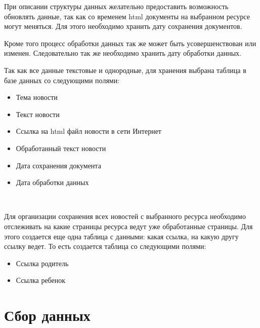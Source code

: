 При описании структуры данных желательно предоставить возможность обновлять данные, так как со временем html документы на выбранном ресурсе могут меняться. Для этого необходимо хранить дату сохранения документов.

Кроме того процесс обработки данных так же может быть усовершенствован или изменен. Следовательно так же необходимо хранить дату обработки данных.

Так как все данные текстовые и однородные, для хранения выбрана таблица в базе данных со следующими полями: 

\begin{itemize}
    \item Тема новости
    \item Текст новости 
    \item Ссылка на html файл новости в сети Интернет
    \item Обработанный текст новости
    \item Дата сохранения документа
    \item Дата обработки данных
\end{itemize}

~\

Для организации сохранения всех новостей с выбранного ресурса необходимо отслеживать на какие страницы ресурса ведут уже обработанные страницы. Для этого создается еще одна таблица с данными: какая ссылка, на какую другу ссылку ведет. То есть создается таблица со следующими полями: 

\begin{itemize}
    \item Ссылка родитель
    \item Ссылка ребенок 
\end{itemize}

%
\section{Сбор данных}

